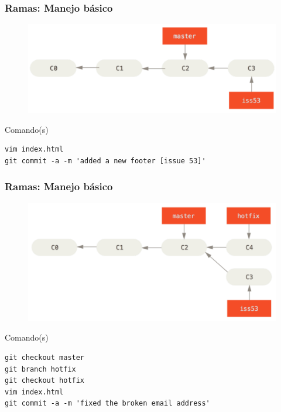 \documentclass{beamer}
\begin{document}
\begin{frame}[fragile]
\frametitle{Ramas: Manejo básico}
\begin{figure}
\includegraphics[width=0.85\linewidth]{img/branching-3.png}
\end{figure}
\vskip 0.50cm
\footnotesize
\begin{block}{Comando(s)}
\begin{verbatim}
vim index.html
git commit -a -m 'added a new footer [issue 53]'
\end{verbatim}
\end{block}
\end{frame}

\begin{frame}[fragile]
\frametitle{Ramas: Manejo básico}
\begin{figure}
\includegraphics[width=0.70\linewidth]{img/branching-4.png}
\end{figure}
\vskip 0.10cm
\scriptsize
\begin{block}{Comando(s)}
\begin{verbatim}
git checkout master
git branch hotfix
git checkout hotfix
vim index.html
git commit -a -m 'fixed the broken email address'
\end{verbatim}
\end{block}
\end{frame}
\end{document}
